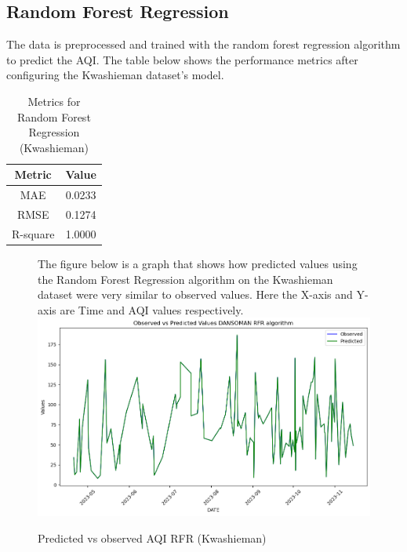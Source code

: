 \documentclass{book}
\numberwithin{equation}{section}
\numberwithin{figure}{section}
\begin{document}
\subsection{Random Forest Regression}
The data is preprocessed and trained with the random forest regression algorithm to predict the AQI. The table below shows the performance metrics after configuring the Kwashieman dataset's model.
\begin{table}[H]
    \centering
    \begin{tabular}{|c|c|}
        \hline
        \textbf{Metric} & \textbf{Value} \\
        \hline
        MAE & 0.0233 \\
        \hline
        RMSE & 0.1274\\
        \hline
        R-square & 1.0000\\
        \hline
    \end{tabular}
    \caption{Metrics for Random Forest Regression (Kwashieman)}
    \label{tab: RFR metrics (Kwashieman)}
\end{table}
\begin{figure}[H]
 \begin{minipage}{\linewidth}
        The figure below is a graph that shows how predicted values using the Random Forest Regression algorithm on the Kwashieman dataset were very similar to observed values. Here the X-axis and Y-axis are Time and AQI values respectively.
        \vspace{0.5em} 
        \includegraphics[width=\linewidth]{kwashieman rfr.png}
       
        \caption{ Predicted vs observed AQI RFR (Kwashieman)}
        \label{fig: RFR Predicted vs observed AQI (Kwashieman)}
    \end{minipage}
\end{figure}
\end{document}
